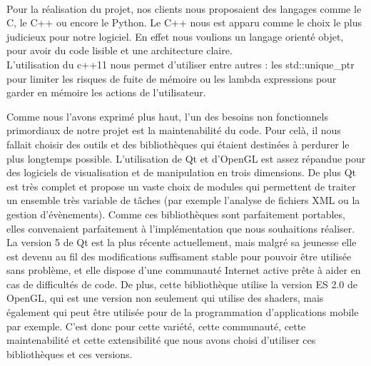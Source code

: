 \paragraph{}
        Pour la réalisation du projet, nos clients nous proposaient des langages comme le C, le C++ ou encore le Python. Le C++ nous est apparu comme le choix le plus judicieux pour notre logiciel. En effet nous voulions un langage orienté objet, pour avoir du code lisible et une architecture claire.\\
		L'utilisation du c++11 nous permet d'utiliser entre autres : les std::unique\_ptr pour limiter les risques de fuite de mémoire ou les lambda expressions pour garder en mémoire les actions de l'utilisateur.

        Comme nous l'avons exprimé plus haut, l'un des besoins non fonctionnels primordiaux de notre projet est la maintenabilité du code. Pour celà, il nous fallait choisir des outils et des bibliothèques qui étaient destinées à perdurer le plus longtemps possible.
        L'utilisation de Qt et d'OpenGL est assez répandue pour des logiciels de visualisation et de manipulation en trois dimensions. De plus Qt est très complet et propose un vaste choix de modules qui permettent de traiter un ensemble très variable de tâches (par exemple l'analyse de fichiers XML ou la gestion d'évènements). Comme ces bibliothèques sont parfaitement portables, elles convenaient parfaitement à l'implémentation que nous souhaitions réaliser.
        La version 5 de Qt est la plus récente actuellement, mais malgré sa jeunesse elle est devenu au fil des modifications suffisament stable pour pouvoir être utilisée sans problème, et elle dispose d'une communauté Internet active prête à aider en cas de difficultés de code. De plus, cette bibliothèque utilise la version ES 2.0 de OpenGL, qui est une version non seulement qui utilise des shaders, mais également qui peut être utilisée pour de la programmation d'applications mobile par exemple. C'est donc pour cette variété, cette communauté, cette maintenabilité et cette extensibilité que nous avons choisi d'utiliser ces bibliothèques et ces versions.
